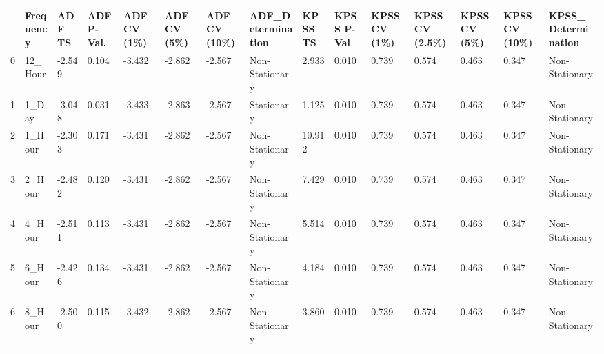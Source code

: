 \begin{tabular}{lllllllllllllll}
\toprule
 & Frequency & ADF TS & ADF P-Val. & ADF CV (1\%) & ADF CV (5\%) & ADF CV (10\%) & ADF_Determination & KPSS TS & KPSS P-Val & KPSS CV (1\%) & KPSS CV (2.5\%) & KPSS CV (5\%) & KPSS CV (10\%) & KPSS_Determination \\
\midrule
0 & 12_Hour & -2.549 & 0.104 & -3.432 & -2.862 & -2.567 & Non-Stationary & 2.933 & 0.010 & 0.739 & 0.574 & 0.463 & 0.347 & Non-Stationary \\
1 & 1_Day & -3.048 & 0.031 & -3.433 & -2.863 & -2.567 & Stationary & 1.125 & 0.010 & 0.739 & 0.574 & 0.463 & 0.347 & Non-Stationary \\
2 & 1_Hour & -2.303 & 0.171 & -3.431 & -2.862 & -2.567 & Non-Stationary & 10.912 & 0.010 & 0.739 & 0.574 & 0.463 & 0.347 & Non-Stationary \\
3 & 2_Hour & -2.482 & 0.120 & -3.431 & -2.862 & -2.567 & Non-Stationary & 7.429 & 0.010 & 0.739 & 0.574 & 0.463 & 0.347 & Non-Stationary \\
4 & 4_Hour & -2.511 & 0.113 & -3.431 & -2.862 & -2.567 & Non-Stationary & 5.514 & 0.010 & 0.739 & 0.574 & 0.463 & 0.347 & Non-Stationary \\
5 & 6_Hour & -2.426 & 0.134 & -3.431 & -2.862 & -2.567 & Non-Stationary & 4.184 & 0.010 & 0.739 & 0.574 & 0.463 & 0.347 & Non-Stationary \\
6 & 8_Hour & -2.500 & 0.115 & -3.432 & -2.862 & -2.567 & Non-Stationary & 3.860 & 0.010 & 0.739 & 0.574 & 0.463 & 0.347 & Non-Stationary \\
\bottomrule
\end{tabular}
